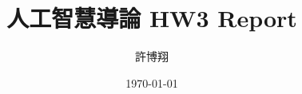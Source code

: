 \setlength{\parindent}{24pt}

\title{人工智慧導論 HW3 Report}
\author{許博翔}
\date{\today}
\maketitle
\thispagestyle{empty}
\setcounter{page}{1}
\pagestyle{fancy}

\renewcommand{\sectionmark}[1]{\markright{#1}}
\renewcommand{\subsectionmark}[1]{}

\lhead{\thetitle}
\chead{}
\rhead{}
\cfoot{}
\rfoot{\thepage}
\renewcommand{\headrulewidth}{0.4pt}
\renewcommand{\footrulewidth}{0.4pt}








\newpage
